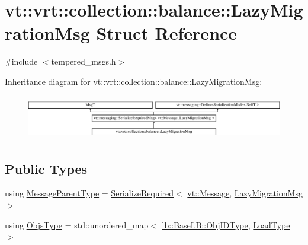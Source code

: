 \hypertarget{structvt_1_1vrt_1_1collection_1_1balance_1_1_lazy_migration_msg}{}\section{vt\+:\+:vrt\+:\+:collection\+:\+:balance\+:\+:Lazy\+Migration\+Msg Struct Reference}
\label{structvt_1_1vrt_1_1collection_1_1balance_1_1_lazy_migration_msg}


{\ttfamily \#include $<$tempered\+\_\+msgs.\+h$>$}

Inheritance diagram for vt\+:\+:vrt\+:\+:collection\+:\+:balance\+:\+:Lazy\+Migration\+Msg\+:\begin{figure}[H]
\begin{center}
\leavevmode
\includegraphics[height=1.962617cm]{structvt_1_1vrt_1_1collection_1_1balance_1_1_lazy_migration_msg}
\end{center}
\end{figure}
\subsection*{Public Types}
\begin{DoxyCompactItemize}
\item 
using \hyperlink{structvt_1_1vrt_1_1collection_1_1balance_1_1_lazy_migration_msg_ae85922f15b423b53083cccda06ef0b45}{Message\+Parent\+Type} = \hyperlink{namespacevt_a9e60e2e8929828639383ac1d6643384d}{Serialize\+Required}$<$ \hyperlink{namespacevt_a3a3ddfef40b4c90915fa43cdd5f129ea}{vt\+::\+Message}, \hyperlink{structvt_1_1vrt_1_1collection_1_1balance_1_1_lazy_migration_msg}{Lazy\+Migration\+Msg} $>$
\item 
using \hyperlink{structvt_1_1vrt_1_1collection_1_1balance_1_1_lazy_migration_msg_a887ad37dade7ba6fe34e93510cf9cef3}{Objs\+Type} = std\+::unordered\+\_\+map$<$ \hyperlink{structvt_1_1vrt_1_1collection_1_1lb_1_1_base_l_b_a790b22acf448880599724749cdc4e9b3}{lb\+::\+Base\+L\+B\+::\+Obj\+I\+D\+Type}, \hyperlink{namespacevt_a8fb51741340b87d7aaee0bef60e9896b}{Load\+Type} $>$
\end{DoxyCompactItemize}

